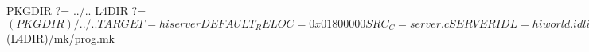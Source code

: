 PKGDIR          ?= ../..
L4DIR           ?= $(PKGDIR)/../..

TARGET          = hiserver
DEFAULT_RELOC   = 0x01800000

SRC_C           = server.c
SERVERIDL       = hiworld.idl

include $(L4DIR)/mk/prog.mk
